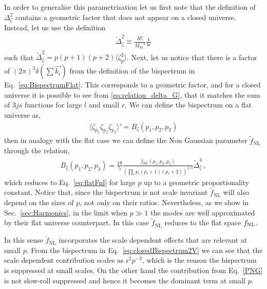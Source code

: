 \documentclass[a4paper,11pt]{article}
\numberwithin{equation}{section}
\newcommand{\mpl}{{M_{\mathrm{Pl}}}}
\numberwithin{equation}{section}
\begin{document}
In order to generalise this parametrisation let us first note that the definition of $\Delta_\zeta^2$ contains a geometric factor that  does not appear on a closed universe. Instead, let us use the definition
\begin{align}
\tilde{\Delta}_\zeta^2\equiv \frac{H_*^4}{\mpl^2}\frac{1}{4\epsilon}
\end{align}
such that $\tilde{\Delta}_\zeta^2=p(p+1)(p+2)\langle\zeta_p^2\rangle$.
Next, let us notice that there is a factor of $(2\pi)^3\delta(\sum \vec{k_i})$ from the definition of the bispectrum in Eq.~\eqref{eq:BispectrumFlat}. This corresponds to a geometric factor, and for a closed universe it is possible to see from 
\eqref{eq:relation_delta_G}, that it matches the sum of $3js$ functions for large $l$ and small $r$. We can define the bispectrum on a flat universe as,
\begin{align}
\langle\zeta_{p_1}\zeta_{p_2}\zeta_{p_3}\rangle'=B_\zeta(p_1,p_2,p_3)
\end{align} then in analogy with the flat case  we can define  the Non Gaussian parameter $\tilde f_{\mathrm{NL}}$ through the relation,
\begin{align}
B_{\zeta}(p_1,p_2,p_3)=\frac{18}{5}\frac{\tilde f_{\mathrm{NL}}(p_1,p_2,p_3)}{\left(\prod_i p_i(p_i+1)(p_i+2)\right)^{2/3}}\tilde\Delta_\zeta^4 \,, \label{eq:closedFnl}
\end{align}
which reduces to Eq.~\eqref{eq:flatFnl} for large $p$ up to a geometric proportionality constant.
Notice that, since the bispectrum is not scale invariant $\tilde f_{\mathrm{NL}}$ will also depend on the sizes of $p$, not only on their ratios. Nevertheless, as we show in Sec.~\ref{sec:Harmonics}, in the limit when $p\gg 1$ the modes are well approximated by their flat universe counterpart. In this case  $\tilde f_{\mathrm{NL}}$ reduces to the flat space  $f_{\rm NL}$. 

In this sense $\tilde f_{\mathrm{NL}}$ incorporates the scale dependent effects that are relevant at small $p$. From the bispectrum in Eq.~\eqref{eq:closedBispectrum2V} we can see that the scale dependent  contribution scales as $\epsilon^2 p^{-2}$, which is the reason the bispectrum is suppressed at small scales. On the other hand the contribution from Eq.~\eqref{PNG} is not slow-roll suppressed and hence it becomes the dominant term at small $p$.
 
\end{document}

